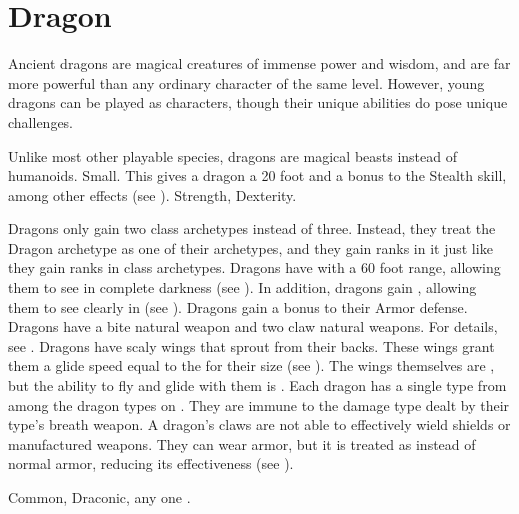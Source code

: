 \section{Dragon}
  Ancient dragons are magical creatures of immense power and wisdom, and are far more powerful than any ordinary character of the same level.
  However, young dragons can be played as characters, though their unique abilities do pose unique challenges.

   Unlike most other playable species, dragons are magical beasts instead of humanoids.
   Small. This gives a dragon a 20 foot  and a  bonus to the Stealth skill, among other effects (see ).
    Strength,  Dexterity.
  \begin{itemize}
     Dragons only gain two class archetypes instead of three.
      Instead, they treat the Dragon archetype as one of their archetypes, and they gain ranks in it just like they gain ranks in class archetypes.
     Dragons have  with a 60 foot range, allowing them to see in complete darkness (see ).
      In addition, dragons gain , allowing them to see clearly in  (see ).
     Dragons gain a  bonus to their Armor defense.
     Dragons have a bite natural weapon and two claw natural weapons.
      For details, see .
     Dragons have scaly wings that sprout from their backs.
      These wings grant them a glide speed equal to the  for their size (see ).
      The wings themselves are , but the ability to fly and glide with them is \magical.
     Each dragon has a single type from among the dragon types on .
      They are immune to the damage type dealt by their type's breath weapon.
     A dragon's claws are not able to effectively wield shields or manufactured weapons.
      They can wear armor, but it is treated as  instead of normal armor, reducing its effectiveness (see ).
  \end{itemize}
   Common, Draconic, any one .

